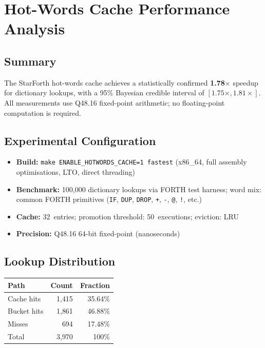 
\section{Hot-Words Cache Performance Analysis}
\label{sec:hotwords-cache-results}

\subsection{Summary}

The StarForth hot-words cache achieves a statistically confirmed
\textbf{1.78$\times$} speedup for dictionary lookups, with a 95\%
Bayesian credible interval of $[1.75\times, 1.81\times]$. All
measurements use Q48.16 fixed-point arithmetic; no floating-point
computation is required.

\subsection{Experimental Configuration}

\begin{itemize}
  \item \textbf{Build:} \texttt{make ENABLE\_HOTWORDS\_CACHE=1 fastest}
        (x86\_64, full assembly optimisations, LTO, direct threading)
  \item \textbf{Benchmark:} 100{,}000 dictionary lookups via FORTH test
        harness; word mix: common FORTH primitives (\texttt{IF}, \texttt{DUP},
        \texttt{DROP}, \texttt{+}, \texttt{-}, \texttt{@}, \texttt{!}, etc.)
  \item \textbf{Cache:} 32~entries; promotion threshold: 50~executions;
        eviction: LRU
  \item \textbf{Precision:} Q48.16 64-bit fixed-point (nanoseconds)
\end{itemize}

\subsection{Lookup Distribution}

\begin{center}
\begin{tabular}{lrr}
\toprule
Path & Count & Fraction \\
\midrule
Cache hits   & 1{,}415 & 35.64\% \\
Bucket hits  & 1{,}861 & 46.88\% \\
Misses       &   694   & 17.48\% \\
\midrule
Total        & 3{,}970 & 100\% \\
\bottomrule
\end{tabular}
\end{center}

